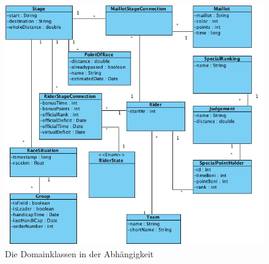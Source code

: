 \begin{figure}[h!]
\caption{Die Domainklassen in der Abhängigkeit}
\label{fig:domain}
\centering
\includegraphics[scale=0.9]{05bericht/images/domain.png}
\end{figure} 


